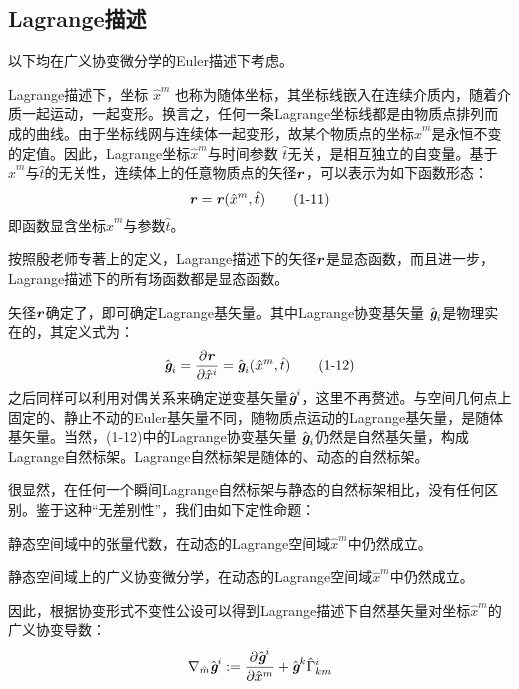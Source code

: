 \documentclass[UTF8]{ctexart}
\begin{document}
\subsection{Lagrange描述}
以下均在广义协变微分学的Euler描述下考虑。\par
Lagrange描述下，坐标 $\hat{x}^m$ 也称为随体坐标，其坐标线嵌入在连续介质内，随着介质一起运动，一起变形。换言之，任何一条Lagrange坐标线都是由物质点排列而成的曲线。由于坐标线网与连续体一起变形，故某个物质点的坐标$\hat{x}^m$是永恒不变的定值。因此，Lagrange坐标$\hat{x}^m$与时间参数
$\hat{t}$无关，是相互独立的自变量。基于$\hat{x}^m$与$\hat{t}$的无关性，连续体上的任意物质点的矢径$\textbf{\textit{r}}$，可以表示为如下函数形态：
\begin{equation*}
    \textbf{\textit{r}}=\textbf{\textit{r}}(\hat{x}^m,\hat{t})\tag{1-11}
\end{equation*}
即函数显含坐标$\hat{x}^m$与参数$\hat{t}$。\par
按照殷老师专著上的定义，Lagrange描述下的矢径$\textbf{\textit{r}}$是显态函数，而且进一步，Lagrange描述下的所有场函数都是显态函数。\par
矢径$\textbf{\textit{r}}$确定了，即可确定Lagrange基矢量。其中Lagrange协变基矢量 $\hat{\textit{\textbf{g}}}_i$是物理实在的，其定义式为：
\begin{equation*}
    \hat{\textit{\textbf{g}}}_i=\frac{\partial\textbf{\textit{r}}}{\partial \hat x^i}=\hat{\textit{\textbf{g}}}_i( \hat{x}^m,\hat t)\tag{1-12}
\end{equation*}
之后同样可以利用对偶关系来确定逆变基矢量$\hat{\textit{\textbf{g}}}^i$，这里不再赘述。与空间几何点上固定的、静止不动的Euler基矢量不同，随物质点运动的Lagrange基矢量，是随体基矢量。当然，(1-12)中的Lagrange协变基矢量 $\hat{\textit{\textbf{g}}}_i$仍然是自然基矢量，构成Lagrange自然标架。Lagrange自然标架是随体的、动态的自然标架。\par
很显然，在任何一个瞬间Lagrange自然标架与静态的自然标架相比，没有任何区别。鉴于这种“无差别性”，我们由如下定性命题：\par
静态空间域中的张量代数，在动态的Lagrange空间域$\hat{x}^m$中仍然成立。\par
静态空间域上的广义协变微分学，在动态的Lagrange空间域$\hat{x}^m$中仍然成立。\par
因此，根据协变形式不变性公设可以得到Lagrange描述下自然基矢量对坐标$\hat{x}^m$的广义协变导数：
\begin{equation*}
    \nabla_{\hat{m}} \hat{\textit{\textbf{g}}}^i := \frac{\partial \hat{\textit{\textbf{g}}}^i}{\partial \hat{x}^m}+\hat{\textit{\textbf{g}}}^k\hat{\Gamma }_{km}^{i}
\end{equation*}
\end{document}
